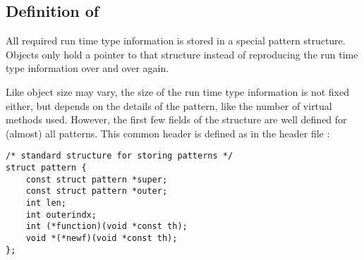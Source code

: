 \subsection{Definition of }
All required run time type information is stored in a special
pattern structure.  Objects only hold a pointer to that structure
instead of reproducing the run time type information over and
over again.

Like object size may vary, the size of the run time type
information is not fixed either, but depends on the details of
the pattern, like the number of virtual methods used.  However,
the first few fields of the structure are well defined for (almost) all
patterns.  This common header is defined as 
in the header file :
\beq\begin{verbatim}/* standard structure for storing patterns */
struct pattern {
    const struct pattern *super;
    const struct pattern *outer;
    int len;
    int outerindx;
    int (*function)(void *const th);
    void *(*newf)(void *const th);
};
\end{verbatim}\eeq


